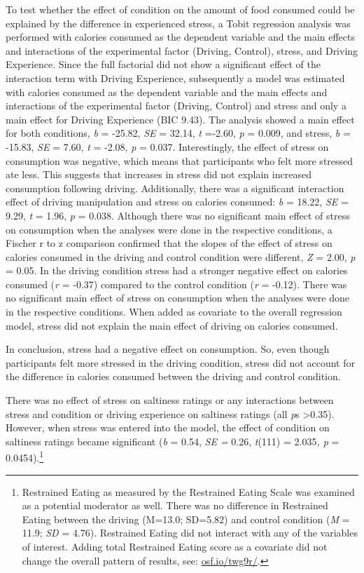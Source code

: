 \documentclass[authordate, empirical, issue]{jote-new-article}
\begin{document}
To test whether the effect of condition on the amount of food consumed could be explained by the difference in experienced stress, a Tobit regression analysis was performed with calories consumed as the dependent variable and the main effects and interactions of the experimental factor (Driving, Control), stress, and Driving Experience. Since the full factorial did not show a significant effect of the interaction term with Driving Experience, subsequently a model was estimated with calories consumed as the dependent variable and the main effects and interactions of the experimental factor (Driving, Control) and stress and only a main effect for Driving Experience (BIC 9.43). The analysis showed a main effect for both conditions, \emph{b }= -25.82, \emph{SE }= 32.14, \emph{t }=-2.60, \emph{p }= 0.009, and stress, \emph{b }= -15.83, \emph{SE }= 7.60, \emph{t }= -2.08, \emph{p }= 0.037. Interestingly, the effect of stress on consumption was negative, which means that participants who felt more stressed ate less. This suggests that increases in stress did not explain increased consumption following driving. Additionally, there was a significant interaction effect of driving manipulation and stress on calories consumed: \emph{b }= 18.22, \emph{SE }= 9.29, \emph{t }= 1.96, \emph{p }= 0.038. Although there was no significant main effect of stress on consumption when the analyses were done in the respective conditions, a Fischer r to z comparison confirmed that the slopes of the effect of stress on calories consumed in the driving and control condition were different, \emph{Z} = 2.00, \emph{p} = 0.05. In the driving condition stress had a stronger negative effect on calories consumed (\emph{r} = -0.37) compared to the control condition (\emph{r }= -0.12). There was no significant main effect of stress on consumption when the analyses were done in the respective conditions. When added as covariate to the overall regression model, stress did not explain the main effect of driving on calories consumed.



In conclusion, stress had a negative effect on consumption. So, even though participants felt more stressed in the driving condition, stress did not account for the difference in calories consumed between the driving and control condition.



There was no effect of stress on saltiness ratings or any interactions between stress and condition or driving experience on saltiness ratings (all \emph{p}s >0.35). However, when stress was entered into the model, the effect of condition on saltiness ratings became significant (\emph{b }= 0.54, \emph{SE = }0.26, \emph{t}(111) = 2.035\emph{, p }= 0.0454).\footnote{ Restrained Eating as measured by the Restrained Eating Scale \parencites{Polivy1978} was examined as a potential moderator as well. There was no difference in Restrained Eating between the driving (M=13.0; SD=5.82) and control condition (\emph{M} = 11.9; \emph{SD} = 4.76). Restrained Eating did not interact with any of the variables of interest. Adding total Restrained Eating score as a covariate did not change the overall pattern of results, see: \href{https://osf.io/twg9r/}{osf.io/twg9r/}.}
\end{document}
